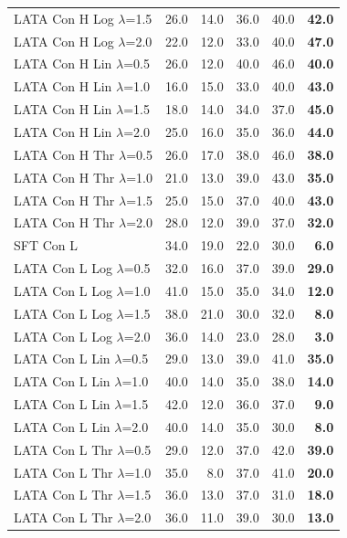 \begin{longtable}{lrrrrr}
LATA Con H Log $\lambda$=1.5 & 26.0 & 14.0 & 36.0 & 40.0 & \textbf{42.0} \\
LATA Con H Log $\lambda$=2.0 & 22.0 & 12.0 & 33.0 & 40.0 & \textbf{47.0} \\
LATA Con H Lin $\lambda$=0.5 & 26.0 & 12.0 & 40.0 & 46.0 & \textbf{40.0} \\
LATA Con H Lin $\lambda$=1.0 & 16.0 & 15.0 & 33.0 & 40.0 & \textbf{43.0} \\
LATA Con H Lin $\lambda$=1.5 & 18.0 & 14.0 & 34.0 & 37.0 & \textbf{45.0} \\
LATA Con H Lin $\lambda$=2.0 & 25.0 & 16.0 & 35.0 & 36.0 & \textbf{44.0} \\
LATA Con H Thr $\lambda$=0.5 & 26.0 & 17.0 & 38.0 & 46.0 & \textbf{38.0} \\
LATA Con H Thr $\lambda$=1.0 & 21.0 & 13.0 & 39.0 & 43.0 & \textbf{35.0} \\
LATA Con H Thr $\lambda$=1.5 & 25.0 & 15.0 & 37.0 & 40.0 & \textbf{43.0} \\
LATA Con H Thr $\lambda$=2.0 & 28.0 & 12.0 & 39.0 & 37.0 & \textbf{32.0} \\
SFT Con L & 34.0 & 19.0 & 22.0 & 30.0 & \textbf{6.0} \\
LATA Con L Log $\lambda$=0.5 & 32.0 & 16.0 & 37.0 & 39.0 & \textbf{29.0} \\
LATA Con L Log $\lambda$=1.0 & 41.0 & 15.0 & 35.0 & 34.0 & \textbf{12.0} \\
LATA Con L Log $\lambda$=1.5 & 38.0 & 21.0 & 30.0 & 32.0 & \textbf{8.0} \\
LATA Con L Log $\lambda$=2.0 & 36.0 & 14.0 & 23.0 & 28.0 & \textbf{3.0} \\
LATA Con L Lin $\lambda$=0.5 & 29.0 & 13.0 & 39.0 & 41.0 & \textbf{35.0} \\
LATA Con L Lin $\lambda$=1.0 & 40.0 & 14.0 & 35.0 & 38.0 & \textbf{14.0} \\
LATA Con L Lin $\lambda$=1.5 & 42.0 & 12.0 & 36.0 & 37.0 & \textbf{9.0} \\
LATA Con L Lin $\lambda$=2.0 & 40.0 & 14.0 & 35.0 & 30.0 & \textbf{8.0} \\
LATA Con L Thr $\lambda$=0.5 & 29.0 & 12.0 & 37.0 & 42.0 & \textbf{39.0} \\
LATA Con L Thr $\lambda$=1.0 & 35.0 & 8.0 & 37.0 & 41.0 & \textbf{20.0} \\
LATA Con L Thr $\lambda$=1.5 & 36.0 & 13.0 & 37.0 & 31.0 & \textbf{18.0} \\
LATA Con L Thr $\lambda$=2.0 & 36.0 & 11.0 & 39.0 & 30.0 & \textbf{13.0} \\
\end{longtable}

